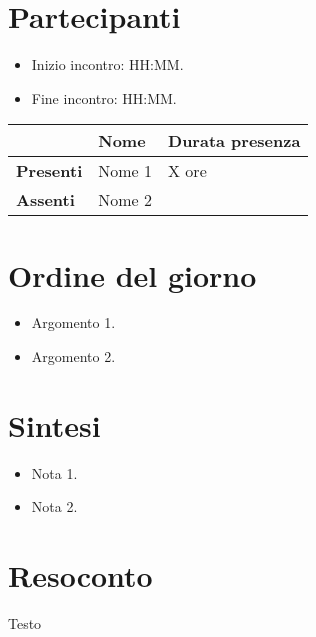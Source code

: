 \documentclass[a4paper, 12pt]{article}
\begin{document}
    
    \copertina{}

    \newpage

\section{Partecipanti}

\begin{itemize}
    \item Inizio incontro: HH:MM.
    \item Fine incontro: HH:MM.
\end{itemize}

\begin{center}
{\renewcommand{\arraystretch}{1.5}
\begin{tabular}{lll}
	                    & \textbf{Nome}  & \textbf{Durata presenza} \\
	\hline
	\textbf{Presenti}   & Nome 1            & X ore     \\
	\hline
	\textbf{Assenti}	& Nome 2            &      		\\
\end{tabular}	
}
\end{center}

\section{Ordine del giorno}
\begin{itemize}
    \item Argomento 1.
    \item Argomento 2.
\end{itemize}

\section{Sintesi}
\begin{itemize}
    \item Nota 1.
    \item Nota 2.
\end{itemize}

\section{Resoconto}
Testo
\end{document}
